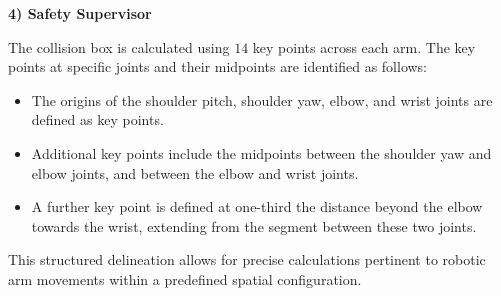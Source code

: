 




\noindent\textbf{4) Safety Supervisor}



The collision box is calculated using $14$ key points across each arm. The key points at specific joints and their midpoints are identified as follows:

\begin{itemize}[leftmargin=*]
    \item The origins of the shoulder pitch, shoulder yaw, elbow, and wrist joints are defined as key points.
    \item Additional key points include the midpoints between the shoulder yaw and elbow joints, and between the elbow and wrist joints.
    \item A further key point is defined at one-third the distance beyond the elbow towards the wrist, extending from the segment between these two joints.
\end{itemize}
This structured delineation allows for precise calculations pertinent to robotic arm movements within a predefined spatial configuration.

